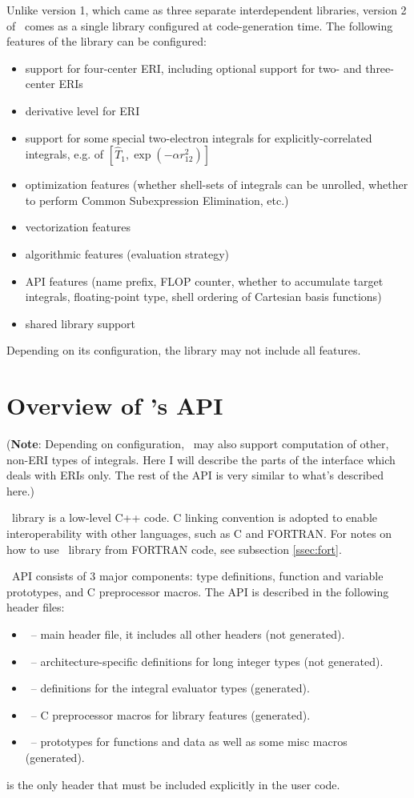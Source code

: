 \documentclass[10pt]{article}
\begin{document}
Unlike version 1, which came as three separate interdependent libraries, version
2 of \LIBINT\ comes as a single library configured at code-generation time.
The following features of the library can be configured:
\begin{itemize}
\item support for four-center ERI, including optional support for two- and
three-center ERIs
\item derivative level for ERI
\item support for some special two-electron integrals for explicitly-correlated
integrals, e.g. of $[\hat{T}_1,\exp(- \alpha r_{12}^2)]$
\item optimization features (whether shell-sets of integrals can be unrolled,
whether to perform Common Subexpression Elimination, etc.)
\item vectorization features
\item algorithmic features (evaluation strategy)
\item API features (name prefix, FLOP counter, whether to accumulate target integrals, floating-point type,
shell ordering of Cartesian basis functions)
\item shared library support
\end{itemize}
Depending on its configuration, the library may not include all features.

\section{Overview of \LIBINT 's API}

({\bf Note}: Depending on configuration, \LIBINT\ may also support computation of other, non-ERI types of integrals. Here I will describe
the parts of the interface which deals with ERIs only. The rest of the API is very similar to what's described here.)

\LIBINT\ library is a low-level C++ code. C linking convention is adopted to enable interoperability with other languages, such as C and FORTRAN.
For notes on how to use \LIBINT\ library from FORTRAN code, see subsection
\ref{ssec:fort}.

\LIBINT\ API consists of 3 major components: type definitions, function and variable prototypes, and C preprocessor macros.
The API is described in the following header files:
\begin{itemize}
\item \libinth\ -- main header file, it includes all other headers (not generated).
\item \libintinttypesh\ -- architecture-specific definitions for long integer types (not generated).
\item \libinttypesh\ -- definitions for the integral evaluator types (generated).
\item \libintparamsh\ -- C preprocessor macros for library features (generated).
\item \libintifaceh\ -- prototypes for functions and data as well as some misc macros (generated).
\end{itemize}
\libinth is the only header that must be included explicitly in the user code.
\end{document}
